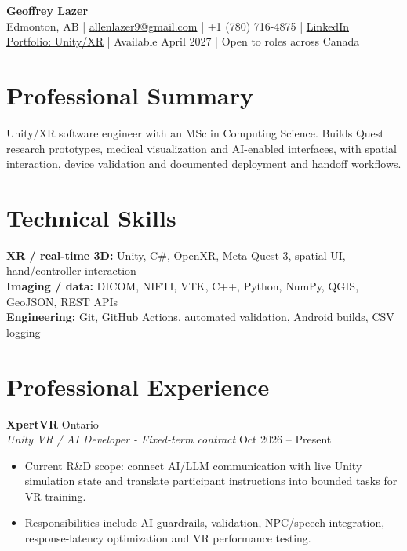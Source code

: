 \documentclass[10pt]{article}
\begin{document}
\begin{center}
    {\Large \textbf{Geoffrey Lazer}}\\[-2pt]
    Edmonton, AB
    \;|\;
    \href{mailto:allenlazer9@gmail.com}{allenlazer9@gmail.com}
    \;|\;
    +1 (780) 716-4875
    \;|\;
    \href{https://linkedin.com/in/geoffrey-lazer-09b0901b2}{LinkedIn}\\[-2pt]
    \href{https://geoff-portfolio-github-io.vercel.app/xr/}{Portfolio: Unity/XR} \;|\; Available April 2027 \;|\; Open to roles across Canada
\end{center}

\section{Professional Summary}

Unity/XR software engineer with an MSc in Computing Science. Builds Quest research prototypes, medical visualization and AI-enabled interfaces, with spatial interaction, device validation and documented deployment and handoff workflows.

\section{Technical Skills}

{\small
\textbf{XR / real-time 3D:} Unity, C\#, OpenXR, Meta Quest 3, spatial UI, hand/controller interaction\\[-1pt]
\textbf{Imaging / data:} DICOM, NIFTI, VTK, C++, Python, NumPy, QGIS, GeoJSON, REST APIs\\[-1pt]
\textbf{Engineering:} Git, GitHub Actions, automated validation, Android builds, CSV logging
}

\section{Professional Experience}

\textbf{XpertVR}
\hfill Ontario\\
\textit{Unity VR / AI Developer - Fixed-term contract}
\hfill Oct 2026 -- Present

\begin{itemize}
    \item Current R\&D scope: connect AI/LLM communication with live Unity simulation state and translate participant instructions into bounded tasks for VR training.
    \item Responsibilities include AI guardrails, validation, NPC/speech integration, response-latency optimization and VR performance testing.
\end{itemize}
\end{document}
